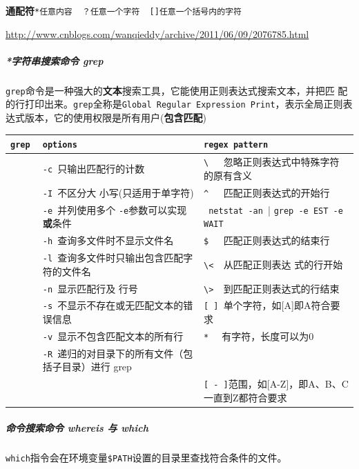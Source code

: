 \documentclass[UTF8,a4paper,12pt]{ctexbook}
\begin{document}
			\textbf{通配符}\verb|*任意内容  ？任意一个字符  []任意一个括号内的字符|
		
			\hspace{1cm} \url{http://www.cnblogs.com/wanqieddy/archive/2011/06/09/2076785.html}
			
		\subparagraph{*字符串搜索命令 grep} \verb|grep|命令是一种强大的\textbf{文本}搜索工具，它能使用正则表达式搜索文本，并把匹 配的行打印出来。\verb|grep|全称是\verb|Global Regular Expression Print|，表示全局正则表达式版本，它的使用权限是所有用户(\textbf{包含匹配})
		
			\begin{table}[H]
				\centering
				\begin{tabular}{l|m{7cm}|m{8cm}}
					\hline
					\verb|grep |   	   & \verb|options| & \verb|regex pattern|\\
					\hline
					\verb| |   	   & \verb|-c |只输出匹配行的计数 & \verb|\   |忽略正则表达式中特殊字符的原有含义\\
					\verb| |   	   & \verb|-I |不区分大 小写(只适用于单字符) & \verb|^   |匹配正则表达式的开始行\\
					\verb| |       & \verb|-e |并列使用多个 \verb|-e|参数可以实现\textbf{或}条件					& \verb| netstat -an || \verb|grep -e EST -e WAIT|\\
					\verb| |   	   & \verb|-h |查询多文件时不显示文件名 & \verb|$   |匹配正则表达式的结束行\\
					\verb| |   	   & \verb|-l |查询多文件时只输出包含匹配字符的文件名 & \verb|\<  |从匹配正则表达 式的行开始\\
					\verb| |   	   & \verb|-n |显示匹配行及 行号& \verb|\>  |到匹配正则表达式的行结束\\
					\verb| |   	   & \verb|-s |不显示不存在或无匹配文本的错误信息 & \verb|[ ] |单个字符，如[A]即A符合要求\\
					\verb| |   	   & \verb|-v |显示不包含匹配文本的所有行 & \verb|*  | 有字符，长度可以为0\\
					\verb| |   	   & \verb|-R |递归的对目录下的所有文件（包括子目录）进行 grep & \\
					\verb| |   	   & & \verb|[ - ]|范围，如[A-Z]，即A、B、C一直到Z都符合要求\\
					\hline
				\end{tabular}
			\end{table}		
			
		\subparagraph{命令搜索命令 whereis 与 which}
			\verb|which|指令会在环境变量\verb|$PATH|设置的目录里查找符合条件的文件。
			
\end{document}
